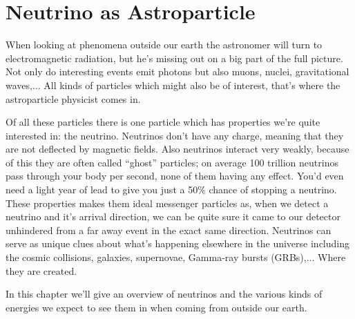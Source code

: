 \chapter{Neutrino as Astroparticle}
\label{chap:neutrino}
When looking at phenomena outside our earth the astronomer will turn to
electromagnetic radiation, but he's missing out on a big part of the full
picture. Not only do interesting events emit photons but also muons, nuclei,
gravitational waves,... All kinds of particles which might also be of interest,
that's where the astroparticle physicist comes in.

Of all these particles there is one particle which has properties we're quite
interested in: the neutrino.  Neutrinos don't have any charge, meaning that
they are not deflected by magnetic fields. Also neutrinos interact very weakly,
because of this they are often called “ghost” particles; on average 100
trillion neutrinos pass through your body per second, none of them having any
effect.  You'd even need a light year of lead to give you just a 50\% chance of
stopping a neutrino.
These properties makes them ideal messenger particles as, when we detect a neutrino
and it's arrival direction, we can be quite sure it came to our detector unhindered
from a far away event in the exact same direction.
Neutrinos can serve as unique clues
about what’s happening elsewhere in the universe including the cosmic
collisions, galaxies, supernovae, Gamma-ray bursts (GRBs),... Where they are created.

In this chapter we'll give an overview of neutrinos and the various kinds of energies we expect
to see them in when coming from outside our earth.

